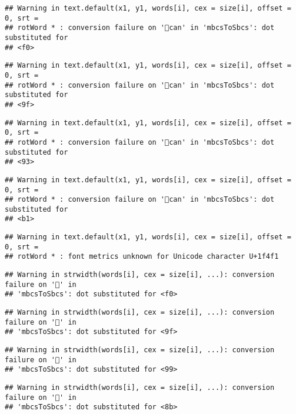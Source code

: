 \documentclass[
]{article}
\begin{document}
\begin{verbatim}
## Warning in text.default(x1, y1, words[i], cex = size[i], offset = 0, srt =
## rotWord * : conversion failure on '📱can' in 'mbcsToSbcs': dot substituted for
## <f0>
\end{verbatim}

\begin{verbatim}
## Warning in text.default(x1, y1, words[i], cex = size[i], offset = 0, srt =
## rotWord * : conversion failure on '📱can' in 'mbcsToSbcs': dot substituted for
## <9f>
\end{verbatim}

\begin{verbatim}
## Warning in text.default(x1, y1, words[i], cex = size[i], offset = 0, srt =
## rotWord * : conversion failure on '📱can' in 'mbcsToSbcs': dot substituted for
## <93>
\end{verbatim}

\begin{verbatim}
## Warning in text.default(x1, y1, words[i], cex = size[i], offset = 0, srt =
## rotWord * : conversion failure on '📱can' in 'mbcsToSbcs': dot substituted for
## <b1>
\end{verbatim}

\begin{verbatim}
## Warning in text.default(x1, y1, words[i], cex = size[i], offset = 0, srt =
## rotWord * : font metrics unknown for Unicode character U+1f4f1
\end{verbatim}

\begin{verbatim}
## Warning in strwidth(words[i], cex = size[i], ...): conversion failure on '🙋' in
## 'mbcsToSbcs': dot substituted for <f0>
\end{verbatim}

\begin{verbatim}
## Warning in strwidth(words[i], cex = size[i], ...): conversion failure on '🙋' in
## 'mbcsToSbcs': dot substituted for <9f>
\end{verbatim}

\begin{verbatim}
## Warning in strwidth(words[i], cex = size[i], ...): conversion failure on '🙋' in
## 'mbcsToSbcs': dot substituted for <99>
\end{verbatim}

\begin{verbatim}
## Warning in strwidth(words[i], cex = size[i], ...): conversion failure on '🙋' in
## 'mbcsToSbcs': dot substituted for <8b>
\end{verbatim}
\end{document}
